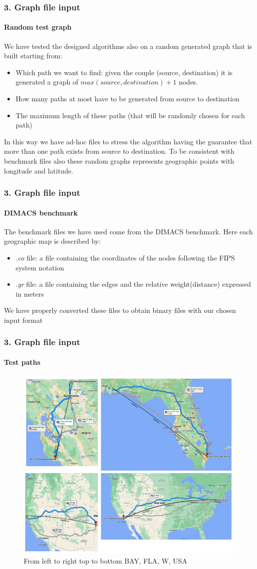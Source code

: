 \documentclass[12pt]{beamer}
\begin{document}
	\begin{frame}
		\frametitle{3. Graph file input}
		\framesubtitle{Random test graph}
		We have tested the designed algorithms also on a random generated graph that
		is built starting from: 
		\begin{itemize}
		\item Which path we want to find: given the couple (source, destination) it is generated a graph of
				$max(source, destination) + 1$ nodes.
		\item How many paths at most have to be generated from source to destination
		\item The maximum length of these paths (that will be randomly chosen for each path)
		\end{itemize}
		In this way we have ad-hoc files to stress the algorithm having the guarantee that more than one path
		exists from source to destination. To be consistent with benchmark files also these
		random graphs represents geographic points with longitude and latitude.
	\end{frame}
	\begin{frame}
		\frametitle{3. Graph file input}
		\framesubtitle{DIMACS benchmark}
		The benchmark files we have used come from the DIMACS benchmark. Here each geographic map is described by:
		\begin{itemize}
			\item \textit{.co} file: a file containing the coordinates of the nodes following the FIPS system notation
			\item \textit{.gr} file: a file containing the edges and the relative weight(distance) expressed in meters
		\end{itemize}
		We have properly converted these files to obtain binary files with our chosen input format
	\end{frame}
	\begin{frame}
		\frametitle{3. Graph file input}
		\framesubtitle{Test paths}
		\begin{figure}[ht!]
			\centering
			\includegraphics[width=0.75\linewidth]{google_maps.png}
			\caption{From left to right top to bottom BAY, FLA, W, USA}
			\label{testpaths}
		\end{figure}
	\end{frame}
\end{document}
